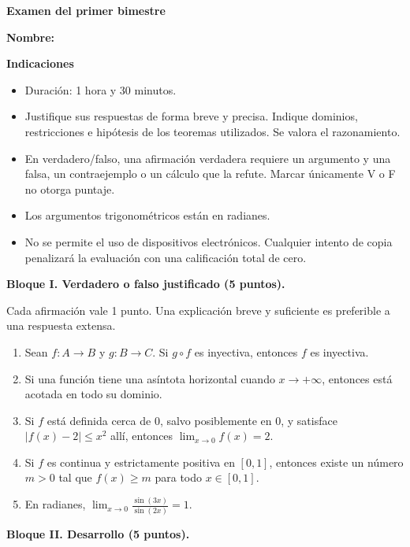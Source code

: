 \documentclass[10pt,a5paper]{article}
\begin{document}
\begin{center}
  {\color{Azul}\large\bfseries Examen del primer bimestre}
\end{center}
\noindent\textbf{Nombre:} \hrulefill
\medskip

\noindent\textbf{Indicaciones}
\begin{itemize}
  \item Duración: 1 hora y 30 minutos.
  \item Justifique sus respuestas de forma breve y precisa. Indique dominios, restricciones e hipótesis de los teoremas utilizados. Se valora el razonamiento.
  \item En verdadero/falso, una afirmación verdadera requiere un argumento y una falsa, un contraejemplo o un cálculo que la refute. Marcar únicamente V o F no otorga puntaje.
  \item  Los argumentos trigonométricos están en radianes.
  \item No se permite el uso de dispositivos electrónicos. Cualquier intento de copia penalizará la evaluación con una calificación total de cero.
\end{itemize}

\noindent\textbf{Bloque I. Verdadero o falso justificado (5 puntos).}

\smallskip
\noindent Cada afirmación vale 1 punto. Una explicación breve y suficiente es preferible a una respuesta extensa.
\begin{enumerate}
  \item Sean $f\colon A\to B$ y $g\colon B\to C$. Si $g\circ f$ es inyectiva, entonces $f$ es inyectiva.
  \item Si una función tiene una asíntota horizontal cuando $x\to+\infty$, entonces está acotada en todo su dominio.
  \item Si $f$ está definida cerca de $0$, salvo posiblemente en $0$, y satisface $|f(x)-2|\leq x^2$ allí, entonces $\lim_{x\to0}f(x)=2$.
  \item Si $f$ es continua y estrictamente positiva en $[0,1]$, entonces existe un número $m>0$ tal que $f(x)\geq m$ para todo $x\in[0,1]$.
  \item En radianes, $\displaystyle\lim_{x\to0}\frac{\sin(3x)}{\sin(2x)}=1$.
\end{enumerate}

\medskip
\noindent\textbf{Bloque II. Desarrollo (5 puntos).}
\end{document}
